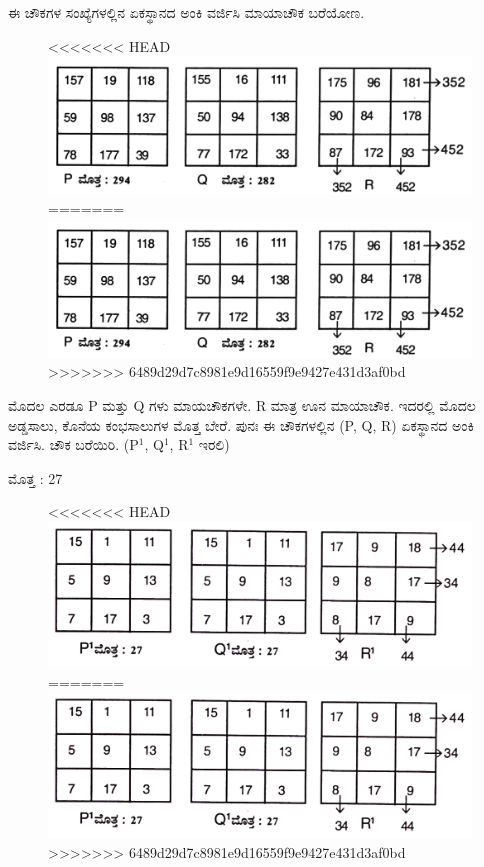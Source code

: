 ಈ ಚೌಕಗಳ ಸಂಖ್ಯೆಗಳಲ್ಲಿನ ಏಕಸ್ಥಾನದ ಅಂಕಿ ವರ್ಜಿಸಿ ಮಾಯಾಚೌಕ ಬರೆಯೋಣ.
\begin{figure}[H]
<<<<<<< HEAD
\includegraphics{src/figures/chap7/fig7-11.jpg}
=======
\includegraphics[scale=0.85]{src/figures/chap7/fig7.11.jpg}
>>>>>>> 6489d29d7c8981e9d16559f9e9427e431d3af0bd
\end{figure}

ಮೊದಲ ಎರಡೂ P ಮತ್ತು Q ಗಳು ಮಾಯಚೌಕಗಳೇ. R ಮಾತ್ರ ಊನ ಮಾಯಾಚೌಕ. ಇದರಲ್ಲಿ ಮೊದಲ ಅಡ್ಡಸಾಲು, ಕೊನೆಯ ಕಂಭಸಾಲುಗಳ ಮೊತ್ತ ಬೇರೆ. ಪುನಃ ಈ ಚೌಕಗಳಲ್ಲಿನ (P, Q, R) ಏಕಸ್ಥಾನದ ಅಂಕಿ ವರ್ಜಿಸಿ. ಚೌಕ ಬರೆಯಿರಿ. (P$^1$, Q$^1$, R$^1$ ಇರಲಿ)

ಮೊತ್ತ : 27
\begin{figure}[H]
<<<<<<< HEAD
\includegraphics{src/figures/chap7/fig7-12.jpg}
=======
\includegraphics[scale=0.85]{src/figures/chap7/fig7.12.jpg}
>>>>>>> 6489d29d7c8981e9d16559f9e9427e431d3af0bd
\end{figure}

